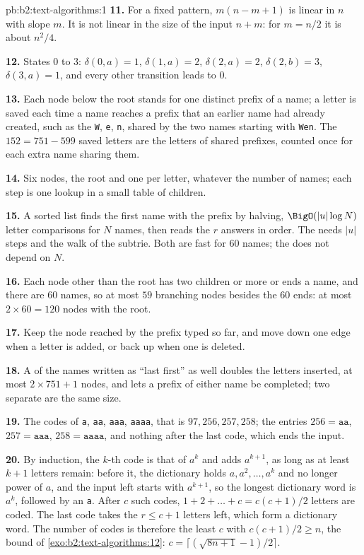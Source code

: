 \begin{solution}{pb:b2:text-algorithms:1}
\textbf{11.} For a fixed pattern, $m(n - m + 1)$ is linear in $n$ with slope $m$. It is not linear in the size of the
input $n + m$: for $m = n/2$ it is about $n^2/4$.

\textbf{12.} States $0$ to $3$: $\delta(0, a) = 1$, $\delta(1, a) = 2$, $\delta(2, a) = 2$, $\delta(2, b) = 3$,
$\delta(3, a) = 1$, and every other transition leads to $0$.

\textbf{13.} Each node below the root stands for one distinct prefix of a name; a letter is saved each time a name
reaches a prefix that an earlier name had already created, such as the \texttt{W}, \texttt{e}, \texttt{n},
\texttt{\textvisiblespace} shared by the two names starting with \texttt{Wen}. The $152 = 751 - 599$ saved letters are
the letters of shared prefixes, counted once for each extra name sharing them.

\textbf{14.} Six nodes, the root and one per letter, whatever the number of names; each step is one lookup in a small
table of children.

\textbf{15.} A sorted list finds the first name with the prefix by halving, $\BigO(|u| \log N)$ letter comparisons for
$N$ names, then reads the $r$ answers in order. The  needs $|u|$ steps and the walk of the subtrie. Both are fast for
60 names; the  does not depend on $N$.

\textbf{16.} Each node other than the root has two children or more or ends a name, and there are 60 names, so at most
$59$ branching nodes besides the 60 ends: at most $2 \times 60 = 120$ nodes with the root.

\textbf{17.} Keep the node reached by the prefix typed so far, and move down one edge when a letter is added, or back up
when one is deleted.

\textbf{18.} A  of the names written as ``last first'' as well doubles the letters inserted, at most $2 \times 751 +
1$ nodes, and lets a prefix of either name be completed; two separate  are the same size.

\textbf{19.} The codes of \texttt{a}, \texttt{aa}, \texttt{aaa}, \texttt{aaaa}, that is $97, 256, 257, 258$; the entries
$256 = \texttt{aa}$, $257 = \texttt{aaa}$, $258 = \texttt{aaaa}$, and nothing after the last code, which ends the
input.

\textbf{20.} By induction, the $k$-th code is that of $a^k$ and adds $a^{k+1}$, as long as at least $k + 1$ letters
remain: before it, the dictionary holds $a, a^2, \dots, a^k$ and no longer power of $a$, and the input left starts
with $a^{k+1}$, so the longest dictionary word is $a^k$, followed by an \texttt{a}. After $c$ such codes, $1 + 2 +
\dots + c = c(c+1)/2$ letters are coded. The last code takes the $r \leq c + 1$ letters left, which form a dictionary
word. The number of codes is therefore the least $c$ with $c(c+1)/2 \geq n$, the bound of
\cref{exo:b2:text-algorithms:12}: $c = \lceil (\sqrt{8n+1}-1)/2 \rceil$.


\end{solution}
